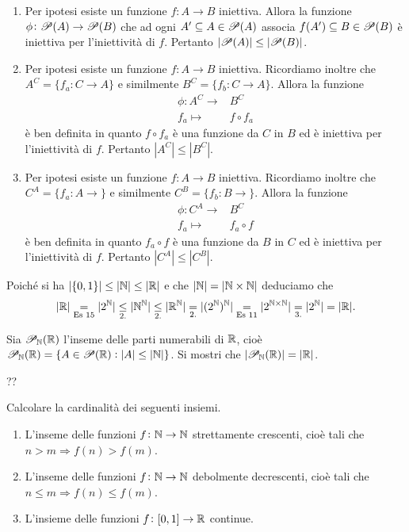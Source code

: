 \documentclass[a4paper]{article}\par \usepackage{style}\par
\begin{document}
\begin{enumerate}
\item Per ipotesi esiste un funzione $ f \colon A \to B $ iniettiva. Allora la funzione $ \phi \colon \P(A) \to \P(B) $ che ad ogni $ A' \subseteq A \in \P(A) $ associa $ f(A') \subseteq B \in \P(B) $ è iniettiva per l'iniettività di $ f $. Pertanto  $ |\P(A)| \leq |\P(B)| $.
\item Per ipotesi esiste un funzione $ f \colon A \to B $ iniettiva. Ricordiamo inoltre che $ A^C = \{f_a \colon C \to A\} $ e similmente $ B^C = \{f_b \colon C \to A\} $. Allora la funzione
  \begin{align*}
    \phi \colon A^C \to & B^C \\
    f_a \mapsto & f \circ f_a
  \end{align*}
  è ben definita in quanto $ f \circ f_a $ è una funzione da $ C $ in $ B $ ed è iniettiva per l'iniettività di $ f $. Pertanto $ |A^C| \leq |B^C| $.
\item Per ipotesi esiste un funzione $ f \colon A \to B $ iniettiva. Ricordiamo inoltre che $ C^A = \{f_a \colon A \to \} $ e similmente $ C^B = \{f_b \colon B \to \} $. Allora la funzione
  \begin{align*}
    \phi \colon C^A \to & B^C \\
    f_a \mapsto & f_a \circ f
  \end{align*}
  è ben definita in quanto $ f_a \circ f $ è una funzione da $ B $ in $ C $ ed è iniettiva per l'iniettività di $ f $. Pertanto $ |C^A| \leq |C^B| $.
\end{enumerate}
Poiché si ha $ |\{0, 1\}| \leq |\N| \leq |\R| $ e che $ |\N| = |\N \times \N| $ deduciamo che
\[|\R| \underset{\text{Es 15}}{=} |2^\N| \underset{\text{2.}}{\leq} |\N^\N| \underset{\text{2.}}{\leq} |\R^\N| \underset{\text{2.}}{=} |(2^\N)^\N| \underset{\text{Es 11}}{=} |2^{\N \times \N}| \underset{\text{3.}}{=} |2^{\N}| = |\R|.\]\par \begin{es}
  Sia $ \P_\N(\R) $ l'inseme delle parti numerabili di $ \R $, cioè $ \P_\N(\R) = \{A \in \P(\R) : |A| \leq |\N|\} $. Si mostri che $ |\P_\N(\R)| = |\R| $.
\end{es}
??\par \begin{es}
  Calcolare la cardinalità dei seguenti insiemi.
  \begin{enumerate}
  \item L'inseme delle funzioni $ f \colon \N \to \N $ strettamente crescenti, cioè tali che $ n > m \Rightarrow f(n) > f(m) $.
  \item L'inseme delle funzioni $ f \colon \N \to \N $ debolmente decrescenti, cioè tali che $ n \leq m \Rightarrow f(n) \leq f(m) $.
  \item L'insieme delle funzioni $ f \colon [0, 1] \to \R $ continue.
  \end{enumerate}
\end{es}
\end{document}
